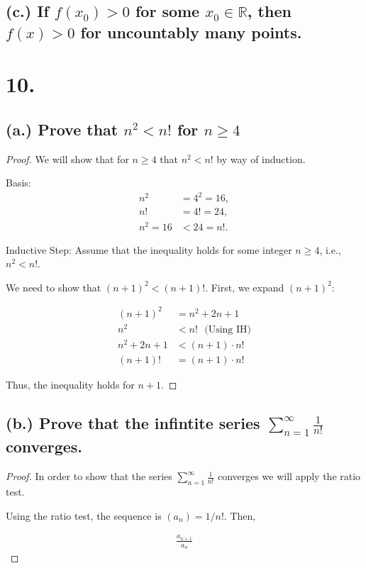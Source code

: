 \documentclass{article}
\begin{document}
\subsection*{(c.) If $f(x_0) >0$ for some $x_0 \in \mathbb{R}$, then $f(x) >0$ for uncountably many points.}

\section*{10.}
\subsection*{(a.) Prove that $n^2 < n!$ for $n \ge 4$}
\begin{proof}

We will show that for $n \ge 4$ that $n^2 < n!$ by way of induction.

Basis:
\begin{align*}
    n^2 &= 4^2 = 16, \\
    n! &= 4! = 24, \\
    n^2 = 16 &< 24 = n!.
  \end{align*}

Inductive Step: Assume that the inequality holds for some integer \( n \ge 4 \), i.e.,
$n^2 < n!$.

We need to show that $(n+1)^2 < (n+1)!$. First, we expand $(n+1)^2:$

\begin{align*}
  (n+1)^2 &= n^2 + 2n + 1 \\
  n^2 &< n!  \text{   $($Using IH$)$}\\
  n^2 + 2n + 1 &< (n+1) \cdot n! \\
  (n+1)! &= (n+1) \cdot n!
\end{align*}

Thus, the inequality holds for $n+1$.


\end{proof}
\subsection*{(b.) Prove that the infintite series $\sum_{n=1}^{\infty} \frac{1}{n!}$ converges.}

\begin{proof}
    In order to show that the series $\sum_{n=1}^{\infty} \frac{1}{n!}$ converges we will apply the ratio test.

    Using the ratio test, the sequence is $(a_n) = 1/n!$. Then,

    \begin{align*}
        \frac{a_{n+1}}{a_n}
    \end{align*}
\end{proof}
\end{document}
